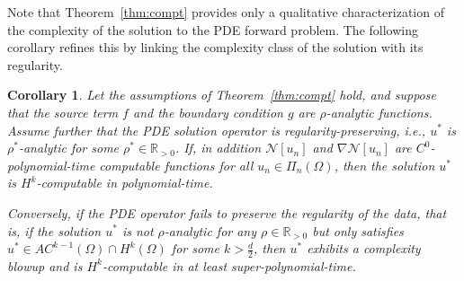 \documentclass[pdflatex]{sn-jnl}%
\newtheorem{corollary}[theorem]{Corollary}
\begin{document}
Note that Theorem~\ref{thm:compt} provides only a qualitative characterization of the complexity of the solution to the PDE forward problem. The following corollary refines this by linking the complexity class of the solution with its regularity.
\begin{corollary}\label{cor:complexity}
   Let the assumptions of Theorem~\ref{thm:compt} hold, and suppose that the source term $f$ and the boundary condition $g$ are $\rho$-analytic functions. Assume further that the PDE solution operator is regularity-preserving, i.e., $u^*$ is $\rho^*$-analytic for some $\rho^*\in \mathbb{R}_{>0}$. If, in addition $\mathcal{N}[u_n]$ and $\nabla\mathcal{N}[u_n]$ are $C^0$-polynomial-time computable functions for all $u_n\in \Pi_{n}(\Omega)$, then the solution $u^*$ is $H^k$-computable in polynomial-time.

Conversely, if the PDE operator fails to preserve the regularity of the data, that is, if the solution $u^*$ is not $\rho$-analytic for any $\rho\in \mathbb{R}_{>0}$ but only satisfies $u^*\in AC^{k-1}(\Omega)\cap H^k(\Omega)$ for some $k>\frac{d}{2}$, then $u^*$ exhibits a complexity blowup and is $H^k$-computable in at least super-polynomial-time.
\end{corollary}
\end{document}
